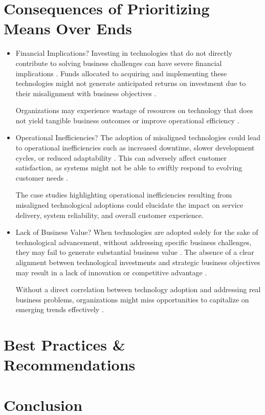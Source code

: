 \documentclass[a4Paper]{article}
\begin{document}
\section{Consequences of Prioritizing Means Over Ends}
\begin{itemize}
    \item Financial Implications?
    Investing in technologies that do not directly contribute to solving business challenges can have severe financial implications \cite{al2020impact}. Funds allocated to acquiring and implementing these technologies might not generate anticipated returns on investment due to their misalignment with business objectives \cite{ilmudeen2019does}.
    
    Organizations may experience wastage of resources on technology that does not yield tangible business outcomes or improve operational efficiency \cite{al2020impact}.
    \item  Operational Inefficiencies?
    The adoption of misaligned technologies could lead to operational inefficiencies such as increased downtime, slower development cycles, or reduced adaptability \cite{rahimi2016business}. This can adversely affect customer satisfaction, as systems might not be able to swiftly respond to evolving customer needs \cite{abrahamsson2017agile}.

    The case studies highlighting operational inefficiencies resulting from misaligned technological adoptions could elucidate the impact on service delivery, system reliability, and overall customer experience.
    \item Lack of Business Value?
    When technologies are adopted solely for the sake of technological advancement, without addressing specific business challenges, they may fail to generate substantial business value \cite{ilmudeen2019does}. The absence of a clear alignment between technological investments and strategic business objectives may result in a lack of innovation or competitive advantage \cite{anzoategui2019endogenous}.

    Without a direct correlation between technology adoption and addressing real business problems, organizations might miss opportunities to capitalize on emerging trends effectively \cite{al2020impact}.
\end{itemize}

\section{Best Practices \& Recommendations}
\section{Conclusion}
\pagebreak


\end{document}
